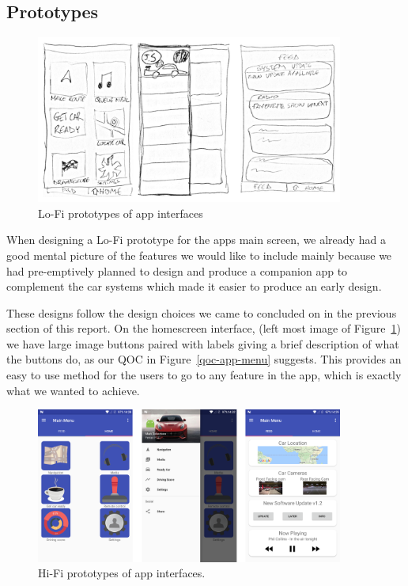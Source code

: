 \documentclass{article}
\begin{document}
\subsection{Prototypes}\label{ssec:app-prototypes-testing}
\begin{figure}[H]
  \centering
  \includegraphics[width=0.9\textwidth]{app-lofi}
  \caption{Lo-Fi prototypes of app interfaces}\label{figure-app-lofi}
\end{figure}

When designing a Lo-Fi prototype for the apps main screen, we already had a good mental picture of the features we would like to include mainly because we had pre-emptively planned to design and produce a companion app to complement the car systems which made it easier to produce an early design.

These designs follow the design choices we came to concluded on in the previous section of this report. On the homescreen interface, (left most image of Figure~\ref{figure-app-lofi}) we have large image buttons paired with labels giving a brief description of what the buttons do, as our QOC in Figure~\ref{qoc-app-menu} suggests. This provides an easy to use method for the users to go to any feature in the app, which is exactly what we wanted to achieve.

\vfill

\begin{figure}[H]
  \centering
  \includegraphics[width=0.9\textwidth]{app-hifi}
  \caption{Hi-Fi prototypes of app interfaces.}\label{figure-app-hifi}
\end{figure}
\end{document}
